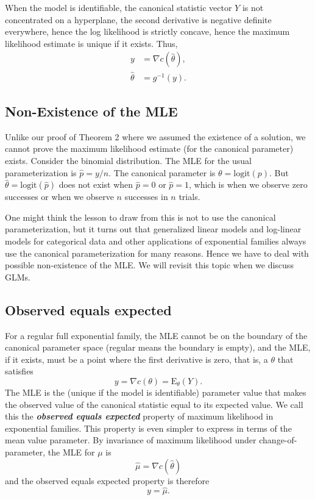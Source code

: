 \documentclass[12pt]{article}
\newcommand{\E}{\mathrm{E}}
\DeclareMathOperator{\E}{E}
\begin{document}
When the model is identifiable, the canonical statistic vector $Y$ is not concentrated on a hyperplane, the second derivative is negative definite everywhere, hence the log likelihood is strictly concave, hence the maximum likelihood estimate is unique if it exists. Thus,
\begin{align*}
  y &= \nabla c(\hat{\theta}), \\
  \hat{\theta} &= g^{-1}(y).
\end{align*}

\vspace{0.5cm}



\subsection*{Non-Existence of the MLE}

Unlike our proof of Theorem 2 where we assumed the existence of a solution, we cannot prove the maximum likelihood estimate (for the canonical parameter) exists. Consider the binomial distribution. The MLE for the usual parameterization is $\hat p = y/n$. The canonical parameter is $\theta = \text{logit}(p)$. But $\hat \theta = \text{logit}(\hat p)$ does not exist when $\hat p = 0$ or $\hat p = 1$, which is when we observe zero successes or when we observe $n$ successes in $n$ trials.

One might think the lesson to draw from this is not to use the canonical parameterization, but it turns out that generalized linear models and log-linear models for categorical data and other applications of exponential families always use the canonical parameterization for many reasons. Hence we have to deal with possible non-existence of the MLE. We will revisit this topic when we discuss GLMs.


\subsection*{Observed equals expected}

For a regular full exponential family, the MLE cannot be on the boundary of the canonical parameter space (regular means the boundary is empty), and the MLE, if it exists, must be a point where the first derivative is zero, that is, a $\theta$ that satisfies
$$
  y = \nabla c(\theta) = \E_\theta(Y).
$$
The MLE is the (unique if the model is identifiable) parameter value that makes the observed value of the canonical statistic equal to its expected value. We call this the {\bf \emph{observed equals expected}} property of maximum likelihood in exponential families. This property is even simpler to express in terms of the mean value parameter. By invariance of maximum likelihood under change-of-parameter, the MLE for $\mu$ is 
$$
  \hat\mu = \nabla c(\hat\theta)
$$
and the observed equals expected property is therefore
\begin{equation} \label{obsequalsexp}
  y = \hat\mu.	
\end{equation}
\end{document}
